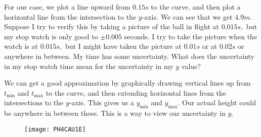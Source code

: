 For our case, we plot a line upward from $0.15\unit{s}$ to the curve, and
then plot a horizontal line from the intersection to the $y$-axis. We can
see that we get $4.9\unit{m}.$ Suppose I try to verify this by taking a
picture of the ball in flight at $0.015\unit{s},$ but my stop watch is only
good to $\pm 0.005$ seconds. I try to take the picture when the watch is at $%
0.015\unit{s},$ but I might have taken the picture at $0.01\unit{s}$ or at $%
0.02\unit{s}$ or anywhere in between. My time has some uncertainty. What
does the uncertainty in my stop watch time mean for the uncertainty in my $y$
value?

We can get a good approximation by graphically drawing vertical lines up
from $t_{\min }$ and $t_{\max }$ to the curve, and then extending horizontal
lines from the intersections to the $y$-axis. This gives us a $y_{\min }$
and $y_{\max }.$ Our actual height could be anywhere in between these. This
is a way to view our uncertainty in $y.$\begin{figure}[h!]
\texttt{[image: PH4CAU1E]}
\end{figure}

